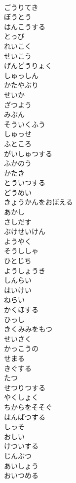 \documentclass[8pt]{extreport}
\begin{document}
\begin{CJK}{UTF8}{min}
\\	ごうりてき
\\	ぼうとう
\\	はんこうする
\\	とっぴ
\\	れいこく
\\	せいこう
\\	げんどうりょく
\\	しゅっしん
\\	かたやぶり
\\	せいか
\\	ざつよう
\\	みぶん
\\	そういくふう
\\	しゅっせ
\\	ふところ
\\	がいしゅつする
\\	ふかのう
\\	かたき
\\	とういつする
\\	どうめい
\\	きょうかんをおぼえる
\\	あかし
\\	さしだす
\\	ぶけせいけん
\\	ようやく
\\	そうししゃ
\\	ひとじち
\\	ようしょうき
\\	しんらい
\\	はいけい
\\	ねらい
\\	かくほする
\\	ひっし
\\	きくみみをもつ
\\	せいさく
\\	かっこうの
\\	せまる
\\	きぐする
\\	たつ
\\	せつりつする
\\	やくしょく
\\	ちからをそそぐ
\\	はんぱつする
\\	しっそ
\\	おしい
\\	けついする
\\	じんぶつ
\\	あいしょう
\\	おいつめる

\end{CJK}
\end{document}
